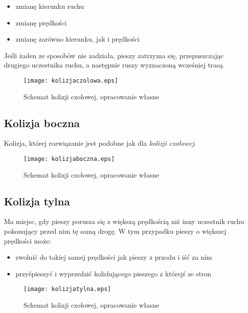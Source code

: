 \begin{itemize}
\item zmianę kierunku ruchu
\item zmianę prędkości
\item zmianę zarówno kierunku, jak i prędkości
\end{itemize}

Jeśli żaden ze sposobów nie zadziała, pieszy zatrzyma się, przepuszczając drugiego uczestnika ruchu, a następnie ruszy wyznaczoną wcześniej trasą.


\begin{figure}
\centering
\texttt{[image: kolizjaczolowa.eps]}
\caption{Schemat kolizji czołowej, opracowanie własne}
\end{figure}

\subsection{Kolizja boczna}

Kolizja, której rozwiązanie jest podobne jak dla \textit{kolizji czołowej}.

\begin{figure}
\centering
\texttt{[image: kolizjaboczna.eps]}
\caption{Schemat kolizji czołowej, opracowanie własne}
\end{figure}

\subsection{Kolizja tylna}

Ma miejsc, gdy pieszy porusza się z większą prędkością niż inny uczestnik ruchu pokonujący przed nim tę samą drogę. W tym przypadku pieszy o większej prędkości może:

\begin{itemize}
\item zwolnić do takiej samej prędkości jak pieszy z przodu i iść za nim
\item przyśpieszyć i wyprzedzić kolidującego pieszego z którejś ze stron
\end{itemize}

\begin{figure}
\centering
\texttt{[image: kolizjatylna.eps]}
\caption{Schemat kolizji czołowej, opracowanie własne}
\end{figure}
